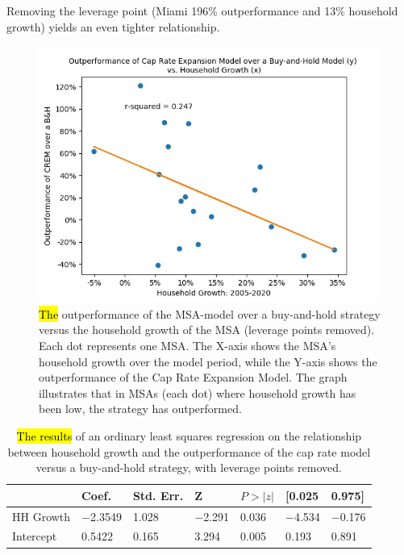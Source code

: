 \documentclass[jrfm,article,accept,oneauthor,pdftex]{Definitions/mdpi}
\begin{document}
Removing the leverage point (Miami 196\% outperformance and 13\% household growth) yields an even tighter relationship.

\begin{figure}[H]
\includegraphics[scale=0.75]{Definitions/msa_scatter_no_minmax.jpg}
\caption{\hl{The}   %
 outperformance of the MSA-model over a buy-and-hold strategy versus the household growth of the MSA (leverage points removed). Each dot represents one MSA. The X-axis shows the MSA's household growth over the model period, while the Y-axis shows the outperformance of the Cap Rate Expansion Model. The graph illustrates that in MSAs (each dot) where household growth has been low, the strategy has outperformed. \label{fig1}}
\end{figure}



\begin{table}[H]
\tabcolsep=0.35cm
  \caption{\hl{The results} %
 of an ordinary least squares regression on the relationship between household growth and the outperformance of the cap rate model versus a buy-and-hold strategy, with leverage points removed.}
    \begin{tabular}{lllllll}
    \toprule
          & {\textbf{Coef.}} & {\textbf{Std. Err.}} & {\textbf{Z}} & {\boldmath${P>|z|}$} & {\textbf{[0.025}} & {\textbf{0.975]}} \\
          \midrule
    HH Growth &$ -$2.3549 & 1.028 & $-$2.291 & 0.036 & $-$4.534 & $-$0.176 \\
    Intercept & 0.5422 & 0.165 & 3.294 & 0.005 & 0.193 & 0.891 \\
    \bottomrule
    \end{tabular}%
  \label{tab:addlabel}%
\end{table}%
\end{document}
